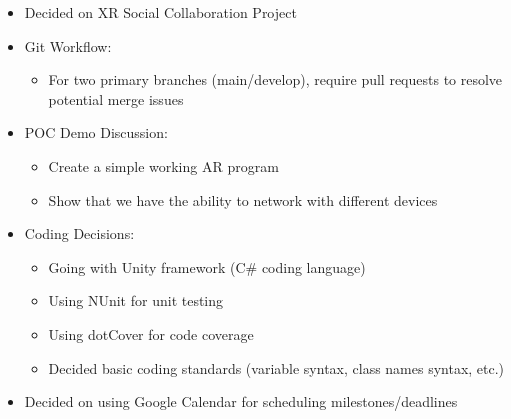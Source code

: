 \documentclass{article}
\begin{document}
\begin{itemize}
    \item Decided on XR Social Collaboration Project
    \item Git Workflow:
    \begin{itemize}
        \item For two primary branches (main/develop), require pull requests to resolve potential merge issues
    \end{itemize}

    \item POC Demo Discussion:
    \begin{itemize}
        \item Create a simple working AR program
        \item Show that we have the ability to network with different devices
    \end{itemize}

    \item Coding Decisions:
    \begin{itemize}
        \item Going with Unity framework (C# coding language)
        \item Using NUnit for unit testing
        \item Using dotCover for code coverage
        \item Decided basic coding standards (variable syntax, class names syntax, etc.)
    \end{itemize}
    \item Decided on using Google Calendar for scheduling milestones/deadlines
\end{itemize}
\end{document}
